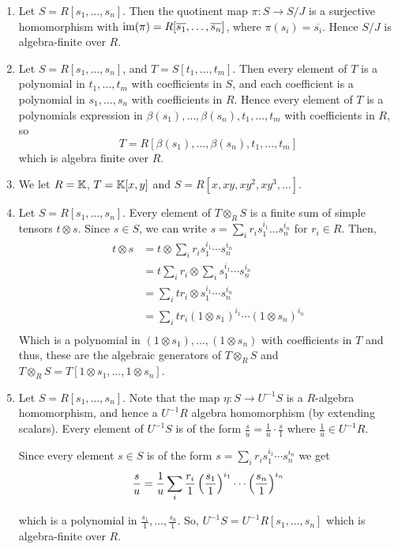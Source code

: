 \documentclass[Notebook.tex]{subfiles}
\begin{document}
\begin{solution}
    \bbni 

    \begin{enumerate}
        \item Let $S = R[s_1, \ldots, s_n]$. Then the quotinent map $\pi: S \to S/J$ is a surjective homomorphism with $\operatorname{im}(\pi) = R[\overline{s_1}, \ldots, \overline{s_n}]$, where $\pi(s_i) = \overline{s_i}$. Hence $S/J$ is algebra-finite over $R$. 
        
        \item Let $S = R[s_1, \ldots, s_n]$, and $T = S[t_1, \ldots, t_m]$. Then every element of $T$ is a polynomial in $t_1, \ldots, t_m$ with coefficients in $S$, and each coefficient is a polynomial in $s_1, \ldots, s_n$ with coefficients in $R$. Hence every element of $T$ is a polynomials expression in $\beta(s_1), \ldots, \beta(s_n), t_1, \ldots, t_m$ with coefficients in $R$, so
        \[T = R[\beta(s_1), \ldots, \beta(s_n), t_1, \ldots, t_m]\]
        which is algebra finite over $R$. 

        \item We let $R = \mathbb K$, $T = \mathbb K[x, y]$ and $S = R[x, xy, xy^2, xy^3, \ldots]$.
        
        \item Let $S = R[s_1, \ldots, s_n]$. Every element of $T \otimes_R S$ is a finite sum of simple tensors $t \otimes s$. Since $s \in S$, we can write $s = \sum_i r_i s_1^{i_1} \ldots s_n^{i_n}$ for $r_i \in R$. Then, 
        \begin{align*}
            t \otimes s &= t \otimes \sum_i r_i s_1^{i_1} \cdots s_n^{i_n} \\ 
            &= t \sum_i r_i \otimes \sum_i s_1^{i_1} \cdots s_n^{i_n}  \\ 
            &= \sum_i t r_i \otimes s_1^{i_1} \cdots s_n^{i_n} \\ 
            &= \sum_i t r_i  (1 \otimes s_1)^{i_1} \cdots (1 \otimes s_n)^{i_n} \\ 
        \end{align*}
        Which is a polynomial in $(1 \otimes s_1), \ldots, (1 \otimes s_n)$ with coefficients in $T$ and thus, these are the algebraic generators of $T\otimes_R S$ and  $T \otimes_R S = T [1 \otimes s_1, \ldots, 1 \otimes s_n]$. 


        \item Let $S = R[s_1, \ldots, s_n]$. Note that the map $\eta: S \to U^{-1}S$ is a $R$-algebra homomorphism, and hence a $U^{-1}R$ algebra homomorphism (by extending scalars). Every element of $U^{-1}S$ is of the form $\frac{s}{u} = \frac{1}{u} \cdot \frac{s}{1}$ where $\frac{1}{u} \in U^{-1}R$. 
        
        Since every element $s \in S$ is of the form $s = \sum_i r_i s_1^{i_1} \cdots s_n^{i_n}$ we get 
        \[\frac{s}{u} = \frac{1}{u}\sum_i \frac{r_i}{1} \left(\frac{s_1}{1}\right)^{i_1} \cdots \left(\frac{s_n}{1}\right)^{i_n}\]
        
        
        which is a polynomial in $\frac{s_1}{1}, \ldots, \frac{s_n}{1}$.  So, $U^{-1}S = U^{-1}R[s_1, \ldots, s_n]$ which is algebra-finite over $R$. 
    \end{enumerate}
\end{solution}
\end{document}
